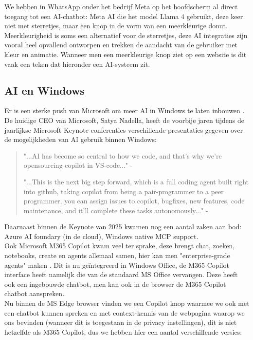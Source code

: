 We hebben in WhatsApp onder het bedrijf Meta op het hoofdscherm al direct toegang tot een AI-chatbot: Meta AI die het model Llama 4 gebruikt, deze keer niet met sterretjes, maar een knop in de vorm van een meerkleurige donut. Meerkleurigheid is soms een alternatief voor de sterretjes, deze AI integraties zijn vooral heel opvallend ontworpen en trekken de aandacht van de gebruiker met kleur en animatie. Wanneer men een meerkleurige knop ziet op een website is dit vaak een teken dat hieronder een AI-systeem zit.

\subsection{AI en Windows}
\label{ssec:aienwindows}
Er is een sterke push van Microsoft om meer AI in Windows te laten inbouwen \autocite{Microsoft2025}. De huidige CEO van Microsoft, Satya Nadella, heeft de voorbije jaren tijdens de jaarlijkse Microsoft Keynote conferenties verschillende presentaties gegeven over de mogelijkheden van AI gebruik binnen Windows:

\begin{quote}
    "...AI has become so central to how we code, and that's why
    we're opensourcing copilot in VS-code..."
    - \autocite{Microsoft2025}
    
    "...This is the next big step forward, which is a full coding agent built right into github, taking copilot from being a pair-programmer to a peer programmer, you can assign issues to copilot, bugfixes, new features, code maintenance, and it'll complete these tasks autonomously..."
    - \autocite{Microsoft2025}
\end{quote}

Daarnaast binnen de Keynote van 2025 kwamen nog een aantal zaken aan bod: Azure AI foundary (in de cloud), Windows native MCP support. \\

Ook Microsoft M365 Copilot kwam veel ter sprake, deze brengt chat, zoeken, notebooks, create en agents allemaal samen, hier kan men "enterprise-grade agents" maken \autocite{Microsoft2025}. Dit is nu geïntegreerd in Windows Office, de M365 Copilot interface heeft namelijk die van de standaard MS Office vervangen. Deze heeft ook een ingebouwde chatbot, men kan ook in de browser de M365 Copilot chatbot aanspreken. \\

Nu binnen de MS Edge browser vinden we een Copilot knop waarmee we ook met een chatbot kunnen spreken en met context-kennis van de webpagina waarop we ons bevinden (wanneer dit is toegestaan in de privacy instellingen), dit is niet hetzelfde als M365 Copilot, dus we hebben hier een aantal verschillende versies:

